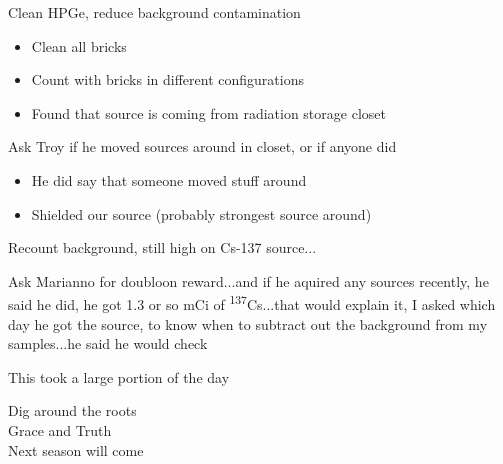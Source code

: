 \documentclass[idxtotoc,hyperref,openany,oneside]{labbook} %
\newcommand{\cmark}{\ding{51}}%
\newcommand{\done}{\rlap{$\square$}{\raisebox{2pt}{\large\hspace{1pt}\cmark}}%
  \hspace{-2.5pt}}
\newcommand{\tss}{\textsuperscript}
\begin{document}

\begin{todolist}
\item[\done]{Clean HPGe, reduce background contamination}
  \begin{itemize}
  \item{Clean all bricks}
  \item{Count with bricks in different configurations}
  \item{Found that source is coming from radiation storage closet}
  \end{itemize}
\item[\done]{Ask Troy if he moved sources around in closet,
  or if anyone did}
  \begin{itemize}
  \item{He did say that someone moved stuff around}
  \item{Shielded our source (probably strongest source around)}
  \end{itemize}
\item[\done]{Recount background, still high on Cs-137 source...}
\item[\done]{Ask Marianno for doubloon reward...and if he aquired
  any sources recently, he said he did, he got 1.3 or so mCi of
  \tss{137}Cs...that would explain it, I asked which day
  he got the source, to know when to subtract out the background
  from my samples...he said he would check}
\item[\done]{This took a large portion of the day}
\end{todolist}

\begin{center}
  Dig around the roots\\
  Grace and Truth \\
  Next season will come
\end{center}


\end{document}
